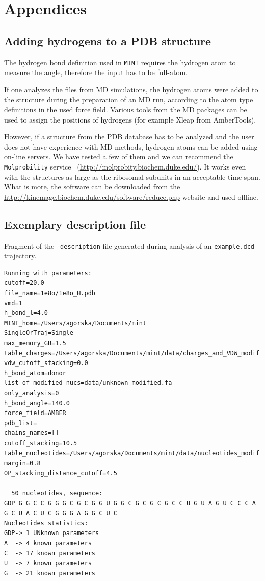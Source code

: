 \documentclass[12pt]{article}
\begin{document}
\section{Appendices}
\begin{appendices}
\subsection{Adding hydrogens to a PDB structure}
The hydrogen bond definition used in {\tt MINT} requires the hydrogen atom to measure the angle, therefore the input has to be full-atom.

If one analyzes the files from MD simulations, the hydrogen atoms were added to the structure during the preparation of an MD run, according to the atom type definitions in the used force field. Various tools from the MD packages can be used to assign the positions of hydrogens (for example Xleap from AmberTools). 

However, if a structure from the PDB database has to be analyzed and the user does not have experience with MD methods, hydrogen atoms can be added using on-line servers. We have tested a few of them and we can recommend the {\tt Molprobility} service~\cite{Chen2010} (\url{http://molprobity.biochem.duke.edu/}). It works even with the structures as large as the ribosomal subunits in an acceptable time span. What is more, the software can be downloaded from the \url{http://kinemage.biochem.duke.edu/software/reduce.php} website and used offline.

\subsection{Exemplary description file}
Fragment of the \texttt{\_description} file generated during analysis of an \texttt{example.dcd} trajectory.
\begin{scriptsize}
\begin{lstlisting}
Running with parameters: 
cutoff=20.0
file_name=1e8o/1e8o_H.pdb
vmd=1
h_bond_l=4.0
MINT_home=/Users/agorska/Documents/mint
SingleOrTraj=Single
max_memory_GB=1.5
table_charges=/Users/agorska/Documents/mint/data/charges_and_VDW_modified.csv
vdw_cutoff_stacking=0.0
h_bond_atom=donor
list_of_modified_nucs=data/unknown_modified.fa
only_analysis=0
h_bond_angle=140.0
force_field=AMBER
pdb_list=
chains_names=[]
cutoff_stacking=10.5
table_nucleotides=/Users/agorska/Documents/mint/data/nucleotides_modified.csv
margin=0.8
OP_stacking_distance_cutoff=4.5

  50 nucleotides, sequence: 
GDP G G C C G G G C G C G G U G G C G C G C G C C U G U A G U C C C A G C U A C U C G G G A G G C U C 
Nucleotides statistics:
GDP-> 1 UNknown parameters
A  -> 4 known parameters
C  -> 17 known parameters
U  -> 7 known parameters
G  -> 21 known parameters


\end{lstlisting}
\end{scriptsize}
\end{appendices}
\end{document}
